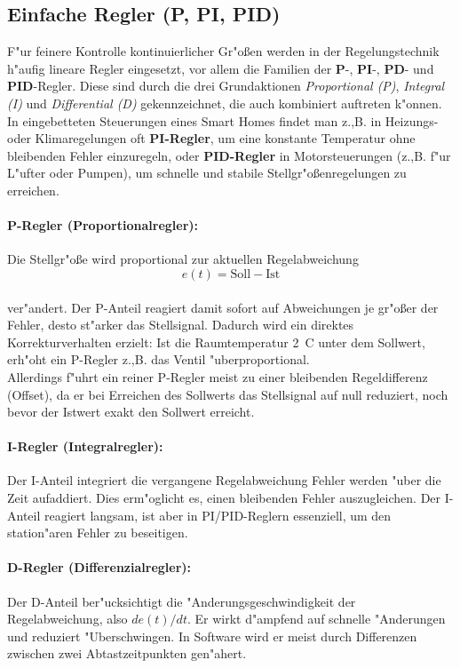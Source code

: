 \subsection*{Einfache Regler (P, PI, PID)}
F"ur feinere Kontrolle kontinuierlicher Gr"o\ss en werden in der Regelungstechnik h"aufig lineare Regler eingesetzt, vor allem die Familien der \textbf{P}-, \textbf{PI}-, \textbf{PD}- und \textbf{PID}-Regler. Diese sind durch die drei Grundaktionen \emph{Proportional (P)}, \emph{Integral (I)} und \emph{Differential (D)} gekennzeichnet, die auch kombiniert auftreten k"onnen.
\\
In eingebetteten Steuerungen eines Smart Homes findet man z.,B. in Heizungs- oder Klimaregelungen oft \textbf{PI-Regler}, um eine konstante Temperatur ohne bleibenden Fehler einzuregeln, oder \textbf{PID-Regler} in Motorsteuerungen (z.,B. f"ur L"ufter oder Pumpen), um schnelle und stabile Stellgr"o\ss enregelungen zu erreichen.
\\
\paragraph{P-Regler (Proportionalregler):} Die Stellgr"o\ss e wird proportional zur aktuellen Regelabweichung \[
e(t) = \mathrm{Soll} - \mathrm{Ist}
\]
\\
 ver"andert. Der P-Anteil reagiert damit sofort auf Abweichungen \textendash{} je gr"o\ss er der Fehler, desto st"arker das Stellsignal. Dadurch wird ein direktes Korrekturverhalten erzielt: Ist die Raumtemperatur 2~\textdegree{}C unter dem Sollwert, erh"oht ein P-Regler z.,B. das Ventil "uberproportional.
 \\
Allerdings f"uhrt ein reiner P-Regler meist zu einer bleibenden Regeldifferenz (Offset), da er bei Erreichen des Sollwerts das Stellsignal auf null reduziert, noch bevor der Istwert exakt den Sollwert erreicht.

\paragraph{I-Regler (Integralregler):} Der I-Anteil integriert die vergangene Regelabweichung \textendash{} Fehler werden "uber die Zeit aufaddiert. Dies erm"oglicht es, einen bleibenden Fehler auszugleichen. \autocite{steuern_regeln} Der I-Anteil reagiert langsam, ist aber in PI/PID-Reglern essenziell, um den station"aren Fehler zu beseitigen.

\paragraph{D-Regler (Differenzialregler):} Der D-Anteil ber"ucksichtigt die "Anderungsgeschwindigkeit der Regelabweichung, also $de(t)/dt$. Er wirkt d"ampfend auf schnelle "Anderungen und reduziert "Uberschwingen. \autocite{steuern_regeln} In Software wird er meist durch Differenzen zwischen zwei Abtastzeitpunkten gen"ahert.

